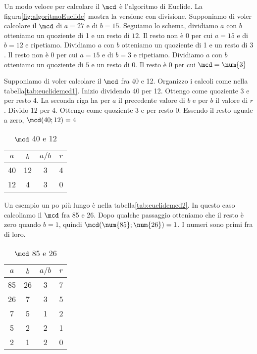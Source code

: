    Un modo veloce per calcolare il $\mcd$ è l'algoritmo di Euclide. La figura\nobs\vref{fig:algoritmoEuclide} mostra la versione con divisione. Supponiamo di voler calcolare il $\mcd$ di $a=\num{27}$ e di $b=\num{15}$. Seguiamo lo schema, dividiamo $a$ con $b$ otteniamo un quoziente di 1 e un resto di $12$. Il resto non è $0$ per cui $a=\num{15}$ e di $b=\num{12}$ e ripetiamo. Dividiamo $a$ con $b$ otteniamo un quoziente di 1 e un resto di $3$. Il resto non è $0$ per cui $a=\num{15}$ e di $b=\num{3}$ e ripetiamo.  Dividiamo $a$ con $b$ otteniamo un quoziente di $5$ e un resto di $0$. Il resto è $0$ per cui $\mcd=\num{3}$    
   
   Supponiamo di voler calcolare il $\mcd$ fra \num{40} e \num{12}. Organizzo i calcoli come nella tabella\nobs\vref*{tab:euclidemcd1}. Inizio dividendo \num{40} per \num{12}. Ottengo come quoziente  \num{3} e per resto  \num{4}. La seconda riga ha per $a$ il precedente valore di $b$ e per $b$ il valore di $r$. Divido  \num{12} per \num{4}. Ottengo come quoziente  \num{3} e per resto  \num{0}. Essendo il resto uguale a zero, $\mcd(40;12)=4$
   \begin{table}
   	\centering
   	\begin{tabular}{SSSS}
   		\toprule
   		$a$&$b$&$a/b$&$r$\\
   		&12&3&4\\
   		12&4&3&0\\
   		\bottomrule
   	\end{tabular}
   	\caption[]{$\mcd$ \num{40} e \num{12}}
   	\label{tab:euclidemcd1}
   	\end{table} 
   	
   	Un esempio un po più lungo è nella tabella\nobs\vref*{tab:euclidemcd2}. In questo caso calcoliamo il $\mcd$ fra \num{85} e \num{26}. Dopo qualche passaggio otteniamo che il resto è zero quando $b=1$, quindi $\mcd(\num{85};\num{26})=1$. I numeri sono primi fra di loro. 
   	\begin{table}
   		\centering
   		\begin{tabular}{SSSS}
   			\toprule
   			$a$&$b$&$a/b$&$r$\\
   			&26&3&7\\
   			26&7&3&5\\
   			7&5&1&2\\
   			5&2&2&1\\
   			2&1&2&0\\
   			\bottomrule
   		\end{tabular}
   		\caption[]{$\mcd$ \num{85} e \num{26}}
   		\label{tab:euclidemcd2}
   	\end{table} 
